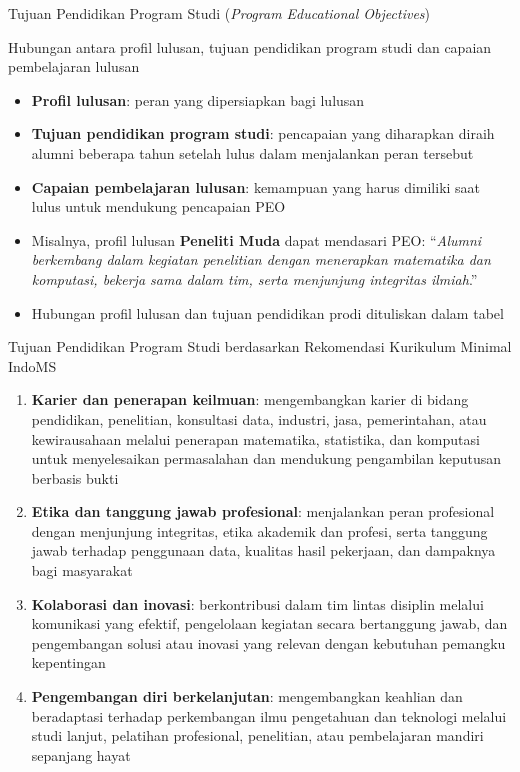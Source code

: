 \documentclass[aspectratio=169,11pt]{beamer}
\begin{document}
\begin{frame}{Tujuan Pendidikan Program Studi (\textit{Program Educational Objectives})}

\begin{block}{Hubungan antara profil lulusan, tujuan pendidikan program studi dan capaian pembelajaran lulusan}
\begin{itemize}
\item \textbf{Profil lulusan}: peran yang dipersiapkan bagi lulusan
\item \textbf{Tujuan pendidikan program studi}: pencapaian yang diharapkan diraih alumni beberapa tahun setelah lulus dalam menjalankan peran tersebut
\item \textbf{Capaian pembelajaran lulusan}: kemampuan yang harus dimiliki saat lulus untuk mendukung pencapaian PEO
\end{itemize}
\end{block}

\begin{itemize}
\item Misalnya, profil lulusan \textbf{Peneliti Muda} dapat mendasari PEO: ``\textit{Alumni berkembang dalam kegiatan penelitian dengan menerapkan matematika dan komputasi, bekerja sama dalam tim, serta menjunjung integritas ilmiah}.''
\item Hubungan profil lulusan dan tujuan pendidikan prodi dituliskan dalam tabel
\end{itemize}

\end{frame}

\begin{frame}{Tujuan Pendidikan Program Studi berdasarkan Rekomendasi Kurikulum Minimal IndoMS}

\begin{enumerate}
\item \textbf{Karier dan penerapan keilmuan}: mengembangkan karier di bidang pendidikan, penelitian, konsultasi data, industri, jasa, pemerintahan, atau kewirausahaan melalui penerapan matematika, statistika, dan komputasi untuk menyelesaikan permasalahan dan mendukung pengambilan keputusan berbasis bukti
\item \textbf{Etika dan tanggung jawab profesional}: menjalankan peran profesional dengan menjunjung integritas, etika akademik dan profesi, serta tanggung jawab terhadap penggunaan data, kualitas hasil pekerjaan, dan dampaknya bagi masyarakat
\item \textbf{Kolaborasi dan inovasi}: berkontribusi dalam tim lintas disiplin melalui komunikasi yang efektif, pengelolaan kegiatan secara bertanggung jawab, dan pengembangan solusi atau inovasi yang relevan dengan kebutuhan pemangku kepentingan
\item \textbf{Pengembangan diri berkelanjutan}: mengembangkan keahlian dan beradaptasi terhadap perkembangan ilmu pengetahuan dan teknologi melalui studi lanjut, pelatihan profesional, penelitian, atau pembelajaran mandiri sepanjang hayat
\end{enumerate}

\end{frame}
\end{document}
